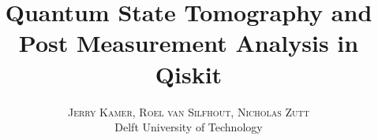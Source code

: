 \documentclass[twoside,twocolumn]{article}
\title{\textbf{Quantum State Tomography and Post Measurement Analysis in
Qiskit}} %
\author{%
\textsc{Jerry Kamer, Roel van Silfhout, Nicholas Zutt}
\\[1ex]
\normalsize{Delft University of Technology}\\ %
}
\date{} %
\begin{document}
	\maketitle














\printbibliography



\appendix

\label{apen} %

\clearpage





\end{document}
